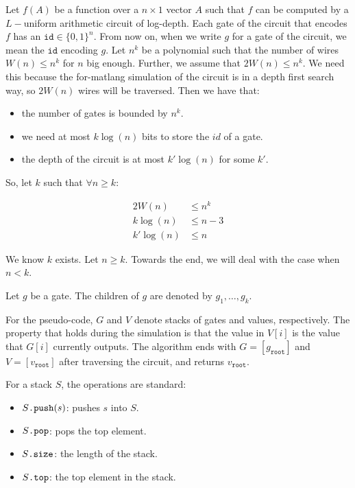 Let $f(A)$ be a function over a $n\times 1$ vector $A$ such that $f$ can be computed by a $L-$uniform arithmetic circuit of log-depth. Each gate of the circuit that encodes $f$ has an $\texttt{id}\in\lbrace 0,1 \rbrace^n$. From now on, when we write $g$ for a gate of the circuit, we mean the $\texttt{id}$ encoding $g$.
Let $n^k$ be a polynomial such that the number of wires $W(n)\leq n^k$ for $n$ big enough. Further, we assume that $2W(n)\leq n^k$. We need this because the for-matlang simulation of the circuit is in a depth first search way, so $2W(n)$ wires will be traversed.
Then we have that:
\begin{itemize}
	\item the number of gates is bounded by $n^k$.
	\item we need at most $k\log (n)$ bits to store the $id$ of a gate.
	\item the depth of the circuit is at most $k'\log (n)$ for some $k'$.
\end{itemize}

So, let $k$ such that $\forall n\geq k:$

\begin{align*}[right=\empheqrbrace (\star)]
    2W(n)&\leq n^k \\
	k\log (n) &\leq n-3 \\
	k'\log(n) &\leq n
\end{align*}

We know $k$ exists. Let $n\geq k$. Towards the end, we will deal with the case when $n<k$.

Let $g$ be a gate. The children of $g$ are denoted by $g_1,\ldots, g_k$.

For the pseudo-code, $G$ and $V$ denote stacks of gates and values, respectively. The property that holds during the simulation is that the value in $V[i]$ is the value that $G[i]$ currently outputs. The algorithm ends with $G=\left[ g_{\texttt{root}}\right]$ and $V=\left[ v_{\texttt{root}}\right]$ after traversing the circuit, and returns $v_{\texttt{root}}$.

For a stack $S$, the operations are standard:

\begin{itemize}
	\item $S\texttt{.push}(s)$: pushes $s$ into $S$.
	\item $S\texttt{.pop}$: pops the top element.
	\item $S\texttt{.size}$: the length of the stack.
	\item $S\texttt{.top}$: the top element in the stack.
\end{itemize}

